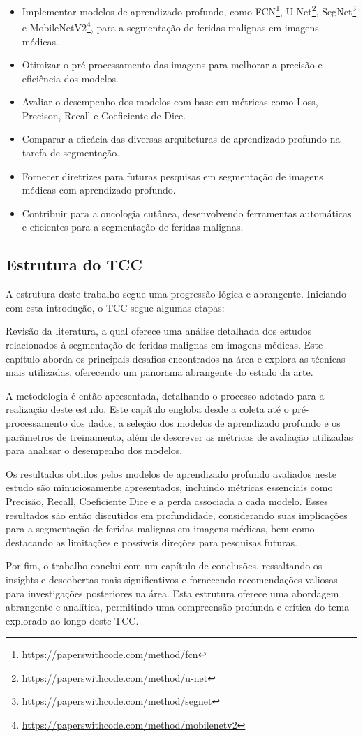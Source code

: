 \begin{itemize}
  \item Implementar modelos de aprendizado profundo, como \ac{FCN}\footnote{\url{https://paperswithcode.com/method/fcn}}, \ac{U-Net}\footnote{\url{https://paperswithcode.com/method/u-net}}, \ac{SegNet}\footnote{\url{https://paperswithcode.com/method/segnet}} e \ac{MobileNetV2}\footnote{\url{https://paperswithcode.com/method/mobilenetv2}}, para a segmentação de feridas malignas em imagens médicas.
  \item Otimizar o pré-processamento das imagens para melhorar a precisão e eficiência dos modelos.
  \item Avaliar o desempenho dos modelos com base em métricas como Loss, Precison, Recall e Coeficiente de Dice.
  \item Comparar a eficácia das diversas arquiteturas de aprendizado profundo na tarefa de segmentação.
  \item Fornecer diretrizes para futuras pesquisas em segmentação de imagens médicas com aprendizado profundo.
  \item Contribuir para a oncologia cutânea, desenvolvendo ferramentas automáticas e eficientes para a segmentação de feridas malignas.
\end{itemize}

\subsection{Estrutura do TCC}

A estrutura deste trabalho segue uma progressão lógica e abrangente. Iniciando com esta introdução, o TCC segue algumas etapas:

Revisão da literatura, a qual oferece uma análise detalhada dos estudos relacionados à segmentação de feridas malignas em imagens médicas. Este capítulo aborda os principais desafios encontrados na área e explora as técnicas mais utilizadas, oferecendo um panorama abrangente do estado da arte.

A metodologia é então apresentada, detalhando o processo adotado para a realização deste estudo. Este capítulo engloba desde a coleta até o pré-processamento dos dados, a seleção dos modelos de aprendizado profundo e os parâmetros de treinamento, além de descrever as métricas de avaliação utilizadas para analisar o desempenho dos modelos.

Os resultados obtidos pelos modelos de aprendizado profundo avaliados neste estudo são minuciosamente apresentados, incluindo métricas essenciais como Precisão, Recall, Coeficiente Dice e a perda associada a cada modelo. Esses resultados são então discutidos em profundidade, considerando suas implicações para a segmentação de feridas malignas em imagens médicas, bem como destacando as limitações e possíveis direções para pesquisas futuras.

Por fim, o trabalho conclui com um capítulo de conclusões, ressaltando os insights e descobertas mais significativos e fornecendo recomendações valiosas para investigações posteriores na área. Esta estrutura oferece uma abordagem abrangente e analítica, permitindo uma compreensão profunda e crítica do tema explorado ao longo deste \ac{TCC}.